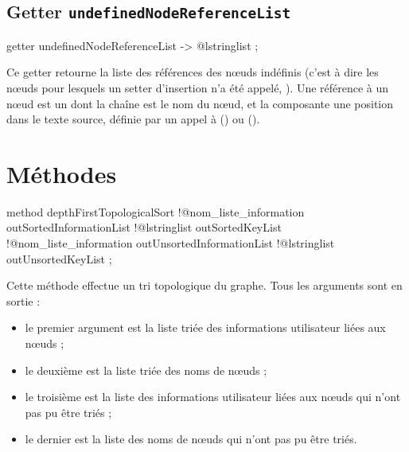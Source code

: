 \subsection{Getter \texttt{undefinedNodeReferenceList}}

\begin{galgascode}
getter undefinedNodeReferenceList -> @lstringlist ;
\end{galgascode}

Ce getter retourne la liste des références des nœuds indéfinis (c'est à dire les nœuds pour lesquels un setter d'insertion n'a été appelé, ). Une référence à un nœud est un  dont la chaîne est le nom du nœud, et la composante  une position dans le texte source, définie par un appel à  () ou  ().




\section{Méthodes}


\begin{galgascode}
method depthFirstTopologicalSort
  !@nom_liste_information outSortedInformationList
  !@lstringlist outSortedKeyList
  !@nom_liste_information outUnsortedInformationList
  !@lstringlist outUnsortedKeyList
;
\end{galgascode}

Cette méthode effectue un tri topologique du graphe. Tous les arguments sont en sortie :
\begin{itemize}
  \item le premier argument  est la liste triée des informations utilisateur liées aux nœuds ;
  \item le deuxième  est la liste triée des noms de nœuds ;
  \item le troisième  est la liste des informations utilisateur liées aux nœuds qui n'ont pas pu être triés ;
  \item le dernier  est la liste des noms de nœuds qui n'ont pas pu être triés.
\end{itemize}

